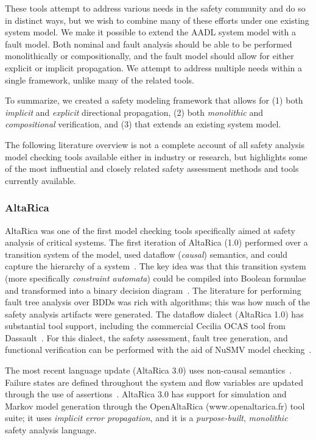 These tools attempt to address various needs in the safety community and do so in distinct ways, but we wish to combine many of these efforts under one existing system model. We make it possible to extend the AADL system model with a fault model. Both nominal and fault analysis should be able to be performed monolithically or compositionally, and the fault model should allow for either explicit or implicit propagation. We attempt to address multiple needs within a single framework, unlike many of the related tools. 

To summarize, we created a safety modeling framework that allows for (1) both {\em implicit} and {\em explicit} directional propagation, (2) both {\em monolithic} and {\em compositional} verification, and (3) that extends an existing system model. 

The following literature overview is not a complete account of all safety analysis model checking tools available either in industry or research, but highlights some of the most influential and closely related safety assessment methods and tools currently available. 

\subsubsection{AltaRica}
AltaRica was one of the first model checking tools specifically aimed at safety analysis of critical systems. The first iteration of AltaRica (1.0) performed over a transition system of the model, used dataflow ({\em causal}) semantics, and could capture the hierarchy of a system~\cite{signoret1998altarica}. The key idea was that this transition system (more specifically {\em constraint automata}) could be compiled into Boolean formulae and transformed into a binary decision diagram~\cite{point1999altarica}. The literature for performing fault tree analysis over BDDs was rich with algorithms; this was how much of the safety analysis artifacts were generated. The dataflow dialect (AltaRica 1.0) has substantial tool support, including the commercial Cecilia OCAS tool from Dassault~\cite{bieber2004safety}. For this dialect, the safety assessment, fault tree generation, and functional verification can be performed with the aid of NuSMV model checking~\cite{symbAltaRica}.

The most recent language update (AltaRica 3.0) uses non-causal semantics~\cite{prosvirnova2013compilationfaulttrees,prosvirnova2015automated,PROSVIRNOVA2013127}. Failure states are defined throughout the system and flow variables are updated through the use of assertions~\cite{Bieber04safetyassessment}.  AltaRica 3.0 has support for simulation and Markov model generation through the OpenAltaRica (www.openaltarica.fr) tool suite; it uses {\em implicit error propagation}, and it is a {\em purpose-built}, {\em monolithic} safety analysis language. 

